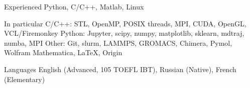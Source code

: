 

\begin{cvskills}

  \cvskill
    {Experienced} %
    {Python, \hspace{7pt} C/C++, \hspace{7pt} Matlab, \hspace{7pt} Linux} %

  \cvskill
    {In particular} %
    {\textsf{C/C++:} STL, \hspace{4pt} OpenMP, \hspace{4pt} POSIX threads, \hspace{4pt} MPI, \hspace{4pt} CUDA, \hspace{4pt} OpenGL, \hspace{4pt} VCL/Firemonkey \newline 
    \textsf{Python:} Jupyter, \hspace{4pt} scipy, \hspace{4pt} numpy, \hspace{4pt} matplotlib, \hspace{4pt} sklearn, \hspace{4pt} mdtraj, \hspace{4pt} numba, \hspace{4pt} MPI \newline
\textsf{Other:} Git, \hspace{4pt} slurm, \hspace{4pt} LAMMPS, \hspace{4pt} GROMACS, \hspace{4pt} Chimera, \hspace{4pt} Pymol, \hspace{4pt} Wolfram Mathematica, \hspace{4pt} \LaTeX, \hspace{4pt} Origin} %

  \cvskill
    {Languages} %
    {English (Advanced, 105 TOEFL IBT), \hspace{7pt} Russian (Native), \hspace{7pt} French (Elementary)} %

\end{cvskills}
